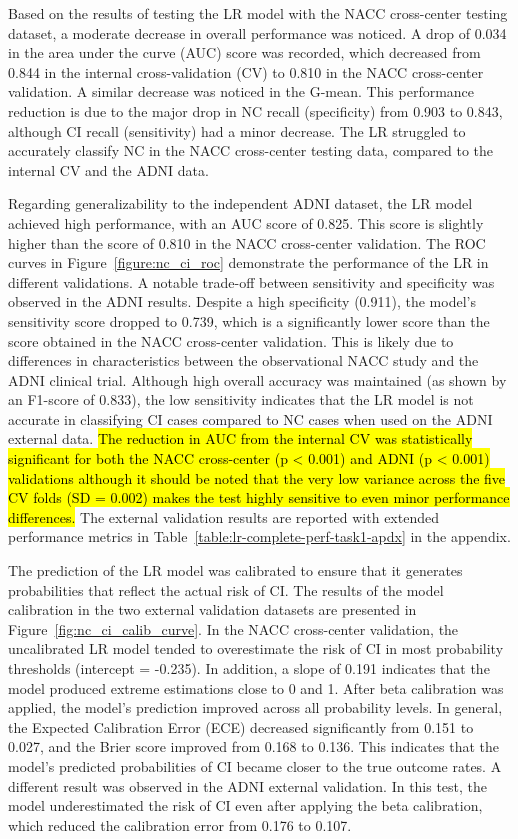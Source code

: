 Based on the results of testing the LR model with the NACC cross-center testing dataset, a moderate decrease in overall performance was noticed. A drop of 0.034 in the area under the curve (\acrshort{AUC}) score was recorded, which decreased from 0.844 in the internal cross-validation (CV) to 0.810 in the NACC cross-center validation. A similar decrease was noticed in the G-mean. This performance reduction is due to the major drop in NC recall (specificity) from 0.903 to 0.843, although CI recall (sensitivity) had a minor decrease. The LR struggled to accurately classify NC in the NACC cross-center testing data, compared to the internal CV and the ADNI data. 

Regarding generalizability to the independent ADNI dataset, the LR model achieved high performance, with an AUC score of 0.825. This score is slightly higher than the score of 0.810 in the NACC cross-center validation. The ROC curves in Figure~\ref{figure:nc_ci_roc} demonstrate the performance of the LR in different validations. A notable trade-off between sensitivity and specificity was observed in the ADNI results. Despite a high specificity (0.911), the model's sensitivity score dropped to 0.739, which is a significantly lower score than the score obtained in the NACC cross-center validation. This is likely due to differences in characteristics between the observational NACC study and the ADNI clinical trial. Although high overall accuracy was maintained (as shown by an F1-score of 0.833), the low sensitivity indicates that the LR model is not accurate in classifying CI cases compared to NC cases when used on the ADNI external data. \hl{The reduction in AUC from the internal CV was statistically significant for both the NACC cross-center (p < 0.001) and ADNI (p < 0.001) validations although it should be noted that the very low variance across the five CV folds (SD = 0.002) makes the test highly sensitive to even minor performance differences.} The external validation results are reported with extended performance metrics in Table~\ref{table:lr-complete-perf-task1-apdx} in the appendix.

The prediction of the LR model was calibrated to ensure that it generates probabilities that reflect the actual risk of CI. The results of the model calibration in the two external validation datasets are presented in Figure~\ref{fig:nc_ci_calib_curve}. In the NACC cross-center validation, the uncalibrated LR model tended to overestimate the risk of CI in most probability thresholds (intercept = -0.235). In addition, a slope of 0.191 indicates that the model produced extreme estimations close to 0 and 1. After beta calibration was applied, the model's prediction improved across all probability levels. In general, the Expected Calibration Error (\acrshort{ECE}) decreased significantly from 0.151 to 0.027, and the Brier score improved from 0.168 to 0.136. This indicates that the model's predicted probabilities of CI became closer to the true outcome rates. A different result was observed in the ADNI external validation. In this test, the model underestimated the risk of CI even after applying the beta calibration, which reduced the calibration error from 0.176 to 0.107.

